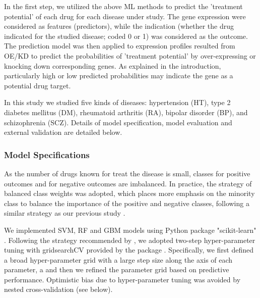     In the first step, we utilized the above ML methods to predict the 'treatment potential' of each drug for each disease under study. The gene expression were considered as features (predictors), while the indication (whether the drug indicated for the studied disease; coded 0 or 1) was considered as the outcome.  The prediction model was then applied to expression profiles resulted from OE/KD to predict the probabilities of 'treatment potential' by over-expressing or knocking down corresponding genes. As explained in the introduction, particularly high or low predicted probabilities may indicate the gene as a potential drug target. 

    In this study we studied five kinds of diseases: hypertension (HT), type 2 diabetes mellitus (DM), rheumatoid arthritis (RA), bipolar disorder (BP), and schizophrenia (SCZ). Details of model specification, model evaluation and external validation are detailed below.  

    \subsubsection{Model Specifications}
      As the number of drugs known for treat the disease is small, classes for positive outcomes and for negative outcomes are imbalanced. In practice, the strategy of balanced class weights was adopted, which places more emphasis on the minority class to balance the importance of the positive and negative classes, following a similar strategy as our previous study \cite{zhao2018drug}. 
      
      We implemented SVM, RF and GBM models using Python package "scikit-learn" \cite{pedregosa2011scikit}. Following the strategy recommended by \cite{hsu2003practical}, we adopted two-step hyper-parameter tuning with gridsearchCV provided by the package \cite{pedregosa2011scikit}.  Specifically, we first defined a broad hyper-parameter grid with a large step size along the axis of each parameter, a and then we refined the parameter grid based on predictive performance. Optimistic bias due to hyper-parameter tuning was avoided by nested cross-validation (see below).
 
